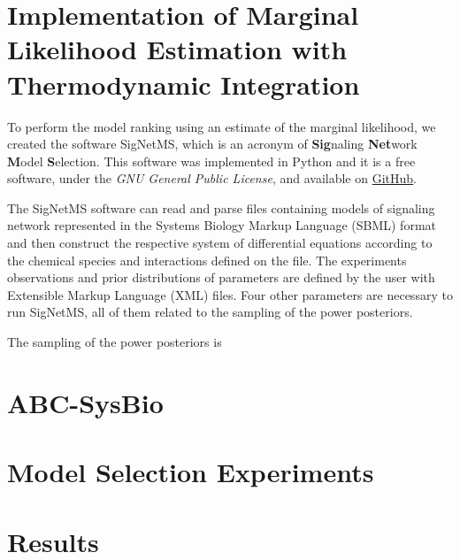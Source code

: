 \section{Implementation of Marginal Likelihood Estimation with 
Thermodynamic Integration}
To perform the model ranking using an estimate of the marginal 
likelihood, we created the software SigNetMS, which is an acronym of 
{\bf Sig}naling {\bf Net}work {\bf M}odel {\bf S}election. This software
was implemented in Python and it is a free software, under the \emph{GNU 
General Public License}, and available on
\href{https://github.com/gustavoem/SigNetMS}{GitHub}.

The SigNetMS software can read and parse files containing models of 
signaling network represented in the Systems Biology Markup Language 
(SBML) format and then construct the respective system of differential 
equations according to the chemical species and interactions defined on
the file. The experiments observations and prior distributions of 
parameters are defined by the user with Extensible Markup Language (XML) 
files. Four other parameters are necessary to run SigNetMS, all of them
related to the sampling of the power posteriors. 

The sampling of the power posteriors is 

\section{ABC-SysBio}

\section{Model Selection Experiments}

\section{Results}


